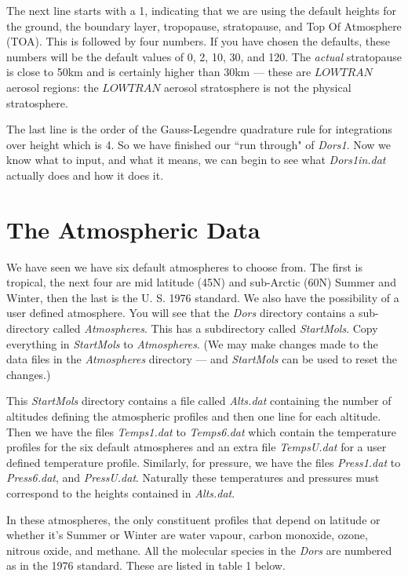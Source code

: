 \documentclass[12pt]{article}
\begin{document}
The next line starts with a 1, indicating that we are using the default heights for
the ground, the boundary layer, tropopause, stratopause, and Top Of Atmosphere (TOA).
This is followed by four numbers. If you have chosen the defaults, these numbers will be
the default values of 0, 2, 10, 30, and 120.
The {\it actual} stratopause is close to 50km and is certainly higher than 30km --- these are
$LOWTRAN$ aerosol regions: the $LOWTRAN$ aerosol stratosphere is not the physical stratosphere.

The last line is the order of the Gauss-Legendre quadrature rule for integrations
over height which is 4. So we have finished our ``run through" of {\it Dors1}. Now we know what to input, and what it means, we
can begin to see what {\it Dors1in.dat} actually does and how it does it.




\section{The Atmospheric Data}

We have seen we have six default atmospheres to choose from. The first is tropical, the next four
are mid latitude (45N) and sub-Arctic (60N)  Summer and Winter, then the last is the U. S. 1976 standard. 
We also have the possibility of a user defined atmosphere.
You will see that the {\it Dors} directory contains a sub-directory  called {\it Atmospheres}.
This has a subdirectory called {\it StartMols}. Copy everything in {\it StartMols} to {\it Atmospheres}.
(We may make changes made to the data files in the {\it Atmospheres} directory  --- and {\it StartMols}
can be used to reset the changes.)


This {\it StartMols} directory contains a file called {\it Alts.dat} containing the number of altitudes defining
the atmospheric profiles and then one line for each altitude. Then we have the files
{\it Temps1.dat} to {\it Temps6.dat} which contain the temperature profiles for the six default atmospheres
and an extra file {\it TempsU.dat} for a user defined temperature profile. Similarly, for pressure,
 we have the files {\it Press1.dat} to {\it Press6.dat}, and {\it PressU.dat}. Naturally these
 temperatures and pressures must correspond to the heights contained in {\it Alts.dat}.

 In these atmospheres, the only constituent profiles that depend on latitude or
whether it's Summer or Winter are water vapour,  carbon monoxide, ozone, nitrous oxide, and methane. 
All the molecular species in the {\it Dors} are numbered as in the 1976 standard. These are listed
in table 1 below.
\end{document}
